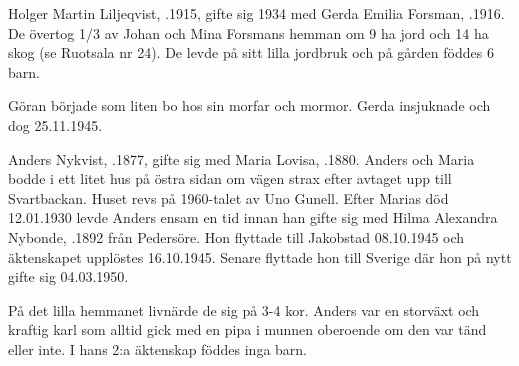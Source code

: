Holger Martin Liljeqvist, .1915, gifte sig 1934 med Gerda Emilia Forsman, .1916. De övertog 1/3 av Johan och Mina Forsmans hemman om 9 ha jord och 14 ha skog (se Ruotsala nr 24). De levde på sitt lilla jordbruk och på gården föddes 6 barn.
\begin{jhchildren}
  \item {}
  \item {}
  \item {}
  \item {}
  \item {}
  \item {}
\end{jhchildren}

Göran började som liten bo hos sin morfar och mormor. Gerda insjuknade och dog 25.11.1945.





Anders Nykvist, .1877, gifte sig med Maria Lovisa, .1880. Anders och Maria bodde i ett litet hus på östra sidan om vägen strax efter avtaget upp till Svartbackan. Huset revs på 1960-talet av Uno Gunell. Efter Marias död 12.01.1930 levde Anders ensam en tid innan han gifte sig med Hilma Alexandra Nybonde, .1892 från Pedersöre. Hon flyttade till Jakobstad 08.10.1945 och äktenskapet upplöstes 16.10.1945. Senare flyttade hon till Sverige där hon på nytt gifte sig 04.03.1950.

På det lilla hemmanet livnärde de sig på 3-4 kor. Anders var en storväxt och kraftig karl som alltid gick med en pipa i munnen oberoende om den var tänd eller inte. I hans 2:a äktenskap föddes inga barn.
\begin{jhchildren}
  \item {}
  \item {}
  \item {}
  \item {}
  \item {}
  \item {}
\end{jhchildren}

